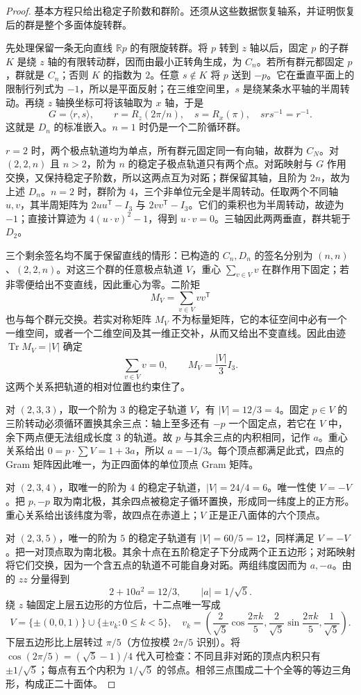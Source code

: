 \begin{proof}
基本方程只给出稳定子阶数和群阶。还须从这些数据恢复轴系，并证明恢复后的群是整个多面体旋转群。

先处理保留一条无向直线 $\mathbb Rp$ 的有限旋转群。将 $p$ 转到 $z$ 轴以后，固定 $p$ 的子群 $K$ 是绕 $z$ 轴的有限转动群，因而由最小正转角生成，为 $C_n$。若所有群元都固定 $p$，群就是 $C_n$；否则 $K$ 的指数为 $2$。任意 $s\notin K$ 将 $p$ 送到 $-p$。它在垂直平面上的限制行列式为 $-1$，所以是平面反射；在三维空间里，$s$ 是绕某条水平轴的半周转动。再绕 $z$ 轴换坐标可将该轴取为 $x$ 轴，于是
\[
G=\langle r,s\rangle,\qquad r=R_z(2\pi/n),\quad s=R_x(\pi),\quad srs^{-1}=r^{-1}.
\]
这就是 $D_n$ 的标准嵌入。$n=1$ 时仍是一个二阶循环群。

$r=2$ 时，两个极点轨道均为单点，所有群元固定同一有向轴，故群为 $C_N$。对 $(2,2,n)$ 且 $n>2$，阶为 $n$ 的稳定子极点轨道只有两个点。对跖映射与 $G$ 作用交换，又保持稳定子阶数，所以这两点互为对跖；群保留其轴，且阶为 $2n$，故为上述 $D_n$。$n=2$ 时，群阶为 $4$，三个非单位元全是半周转动。任取两个不同轴 $u,v$，其半周矩阵为 $2uu^{\mathsf T}-I_3$ 与 $2vv^{\mathsf T}-I_3$。它们的乘积也为半周转动，故迹为 $-1$；直接计算迹为 $4(u\cdot v)^2-1$，得到 $u\cdot v=0$。三轴因此两两垂直，群共轭于 $D_2$。

三个剩余签名均不属于保留直线的情形：已构造的 $C_n,D_n$ 的签名分别为 $(n,n)$、$(2,2,n)$。对这三个群的任意极点轨道 $V$，重心 $\sum_{v\in V}v$ 在群作用下固定；若非零便给出不变直线，因此重心为零。二阶矩
\[
M_V=\sum_{v\in V}vv^{\mathsf T}
\]
也与每个群元交换。若实对称矩阵 $M_V$ 不为标量矩阵，它的本征空间中必有一个一维空间，或者一个二维空间及其一维正交补，从而又给出不变直线。因此由迹 $\operatorname{Tr}M_V=|V|$ 确定
\[
\sum_{v\in V}v=0,\qquad M_V=\frac{|V|}{3}I_3.
\label{eq:finite-rotation-orbit-moments}
\]
这两个关系把轨道的相对位置也约束住了。

对 $(2,3,3)$，取一个阶为 $3$ 的稳定子轨道 $V$，有 $|V|=12/3=4$。固定 $p\in V$ 的三阶转动必须循环置换其余三点：轴上至多还有 $-p$ 一个固定点，若它在 $V$ 中，余下两点便无法组成长度 $3$ 的轨道。故 $p$ 与其余三点的内积相同，记作 $a$。重心关系给出 $0=p\cdot\sum V=1+3a$，所以 $a=-1/3$。每个顶点都满足此式，四点的 Gram 矩阵因此唯一，为正四面体的单位顶点 Gram 矩阵。

对 $(2,3,4)$，取唯一的阶为 $4$ 的稳定子轨道，$|V|=24/4=6$。唯一性使 $V=-V$。把 $p,-p$ 取为南北极，其余四点被稳定子循环置换，形成同一纬度上的正方形。重心关系给出该纬度为零，故四点在赤道上；$V$ 正是正八面体的六个顶点。

对 $(2,3,5)$，唯一的阶为 $5$ 的稳定子轨道有 $|V|=60/5=12$，同样满足 $V=-V$。把一对顶点取为南北极。其余十点在五阶稳定子下分成两个正五边形；对跖映射将它们交换，因为一个含五点的轨道不可能自身对跖。两组纬度因而为 $a,-a$。由  的 $zz$ 分量得到
\[
2+10a^2=12/3,\qquad |a|=1/\sqrt5.
\]
绕 $z$ 轴固定上层五边形的方位后，十二点唯一写成
\[
V=\{\pm(0,0,1)\}\cup\{\pm v_k:0\le k<5\},\quad
v_k=\left(\frac2{\sqrt5}\cos\frac{2\pi k}5,
\frac2{\sqrt5}\sin\frac{2\pi k}5,\frac1{\sqrt5}\right).
\label{eq:icosahedron-orbit-coordinates}
\]
下层五边形比上层转过 $\pi/5$（方位按模 $2\pi/5$ 识别）。将 $\cos(2\pi/5)=(\sqrt5-1)/4$ 代入可检查：不同且非对跖的顶点内积只有 $\pm1/\sqrt5$；每点有五个内积为 $1/\sqrt5$ 的邻点。相邻三点围成二十个全等的等边三角形，构成正二十面体。


\end{proof}

